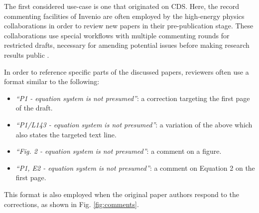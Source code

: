 
The first considered use-case is one that originated on CDS. Here, the record
commenting facilities of Invenio are often employed by the high-energy physics
collaborations in order to review new papers in their pre-publication stage.
These collaborations use special workflows with multiple commenting rounds for
restricted drafts, necessary for amending potential issues before making
research results public \cite{ref:ludmila}.

In order to reference specific parts of the discussed papers, reviewers often
use a format similar to the following:
  \begin{itemize}
      \item \textit{``P1 - equation system is not presumed''}: a correction
          targeting the first page of the draft.
      \item \textit{``P1/L143 - equation system is not presumed''}: a variation
        of the above which also states the targeted text line.
      \item \textit{``Fig. 2 - equation system is not presumed''}: a comment on
        a figure.
      \item \textit{``P1, E2 - equation system is not presumed''}: a comment on
        Equation 2 on the first page.
  \end{itemize}
This format is also employed when the original paper authors respond to the
corrections, as shown in Fig. \ref{fig:comments}.

